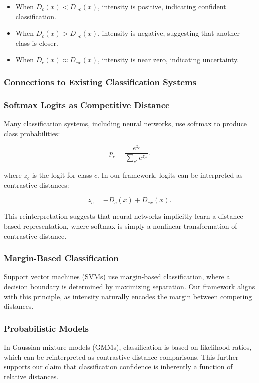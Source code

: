 \documentclass[12pt]{article}
\begin{document}
\begin{itemize}
    \item When \( D_c(x) < D_{\neg c}(x) \), intensity is positive, indicating confident classification.
    \item When \( D_c(x) > D_{\neg c}(x) \), intensity is negative, suggesting that another class is closer.
    \item When \( D_c(x) \approx D_{\neg c}(x) \), intensity is near zero, indicating uncertainty.
\end{itemize}

\subsubsection{Connections to Existing Classification Systems}

\subsubsection{Softmax Logits as Competitive Distance}
Many classification systems, including neural networks, use softmax to produce class probabilities:

\[
p_c = \frac{e^{z_c}}{\sum_{c'} e^{z_{c'}}}.
\]

where \( z_c \) is the logit for class \( c \). In our framework, logits can be interpreted as contrastive distances:

\[
z_c = -D_c(x) + D_{\neg c}(x).
\]

This reinterpretation suggests that neural networks implicitly learn a distance-based representation, where softmax is simply a nonlinear transformation of contrastive distance.

\subsubsection{Margin-Based Classification}
Support vector machines (SVMs) use margin-based classification, where a decision boundary is determined by maximizing separation. Our framework aligns with this principle, as intensity naturally encodes the margin between competing distances.

\subsubsection{Probabilistic Models}
In Gaussian mixture models (GMMs), classification is based on likelihood ratios, which can be reinterpreted as contrastive distance comparisons. This further supports our claim that classification confidence is inherently a function of relative distances.
\end{document}
